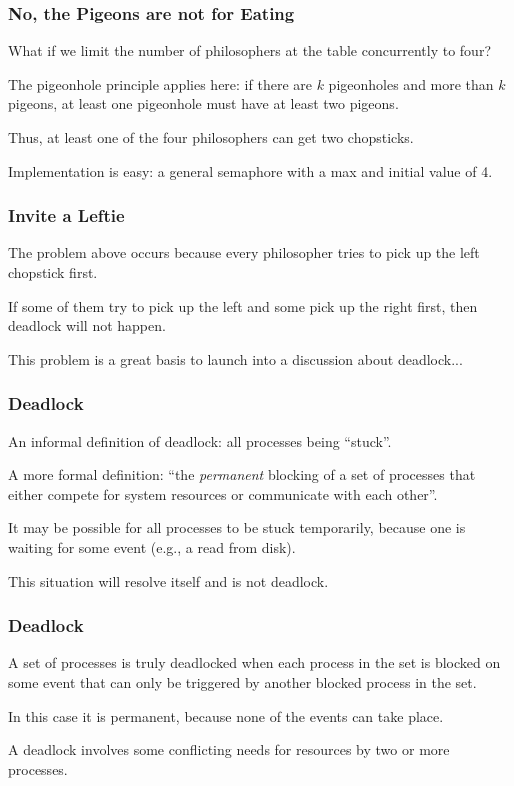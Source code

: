 \begin{frame}
\frametitle{No, the Pigeons are not for Eating}

What if we limit the number of philosophers at the table concurrently to four? 

The pigeonhole principle applies here: if there are $k$ pigeonholes and more than $k$ pigeons, at least one pigeonhole must have at least two pigeons. 

Thus, at least one of the four philosophers can get two chopsticks. 

Implementation is easy: a general semaphore with a max and initial value of 4.

\end{frame}

\begin{frame}
\frametitle{Invite a Leftie}

The problem above occurs because every philosopher tries to pick up the left chopstick first. 

If some of them try to pick up the left and some pick up the right first, then deadlock will not happen.

This problem is a great basis to launch into a discussion about deadlock...

\end{frame}



\begin{frame}
\frametitle{Deadlock}

An informal definition of deadlock: all processes being ``stuck''. 

A more formal definition: ``the \textit{permanent} blocking of a set of processes that either compete for system resources or communicate with each other''.

It may be possible for all processes to be stuck temporarily, because one is waiting for some event (e.g., a read from disk).

This situation will resolve itself and is not deadlock. 

\end{frame}


\begin{frame}
\frametitle{Deadlock}
 A set of processes is truly deadlocked when each process in the set is blocked on some event that can only be triggered by another blocked process in the set. 
 
 In this case it is permanent, because none of the events can take place.

A deadlock involves some conflicting needs for resources by two or more processes. 

\end{frame}

